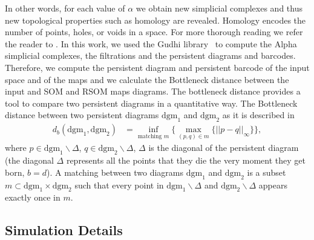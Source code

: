 In other words, for each value of $\alpha$ we obtain new simplicial complexes and thus new topological properties such as  homology are revealed. Homology encodes the number of  points, holes, or voids in a space. For more thorough reading we refer the reader to \citep{Chazal:2017,Ghrist:2008,Zomorodian:2005}. In this work, we used the Gudhi library~\citep{Maria:2014} to compute the Alpha simplicial complexes, the filtrations and the persistent diagrams and barcodes. Therefore, we compute the persistent diagram and persistent barcode of the input space and of the maps and we calculate the Bottleneck distance between the input and SOM and RSOM maps diagrams. The bottleneck distance provides a tool to compare two persistent diagrams in a quantitative way. The Bottleneck distance between two persistent diagrams $\text{dgm}_1$ and $\text{dgm}_2$ as it is described in~\cite{Chazal:2017}
\begin{align}
    \label{eq:bottle}
    d_b(\text{dgm}_1, \text{dgm}_2) &= \inf_{\text{matching }m}\{ \max_{(p, q) \in m} \{||p - q||_{\infty} \} \},
\end{align}
where $p \in \text{dgm}_1 \backslash \Delta$, $q \in \text{dgm}_2 \backslash \Delta$, $\Delta$ is the diagonal of the persistent diagram (the diagonal $\Delta$ represents all the points that they die the very moment they get born, $b = d$). A matching between two  diagrams $\text{dgm}_1$ and $\text{dgm}_2$ is a subset $m \subset \text{dgm}_1 \times \text{dgm}_2$ such that every point in $\text{dgm}_1 \backslash \Delta$ and $\text{dgm}_2 \backslash \Delta$ appears exactly once in $m$. 




\subsection{Simulation Details}

